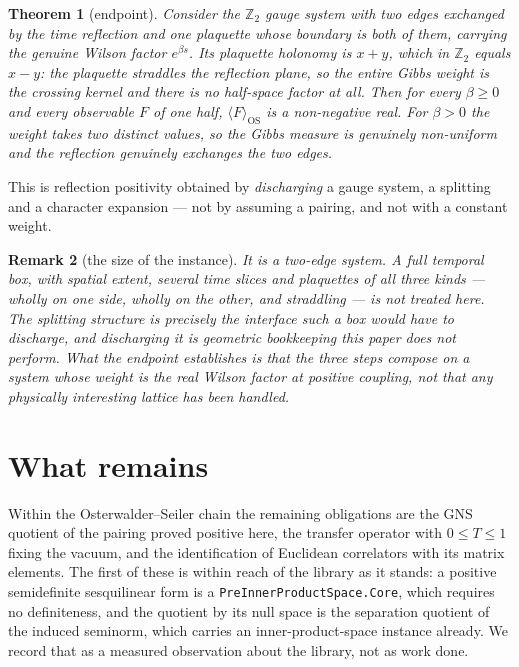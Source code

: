 \documentclass[11pt]{article}
\newtheorem{theorem}{Theorem}[section]
\newtheorem{remark}[theorem]{Remark}
\theoremstyle{definition}
\newcommand{\lean}[1]{\texttt{#1}}
\newcommand{\Z}{\mathbb{Z}}
\begin{document}
\begin{theorem}[endpoint]
\label{thm:endpoint}
Consider the $\Z_2$ gauge system with two edges exchanged by the time
reflection and one plaquette whose boundary is both of them, carrying the
genuine Wilson factor $e^{\beta s}$.  Its plaquette holonomy is $x+y$, which in
$\Z_2$ equals $x-y$: the plaquette \emph{straddles the reflection plane}, so the
entire Gibbs weight is the crossing kernel and there is no half-space factor at
all.  Then for every $\beta \ge 0$ and every observable $F$ of one half,
$\langle F\rangle_{\mathrm{OS}}$ is a non-negative real.  For $\beta > 0$ the
weight takes two distinct values, so the Gibbs measure is genuinely non-uniform
and the reflection genuinely exchanges the two edges.
\end{theorem}

This is reflection positivity obtained by \emph{discharging} a gauge system, a
splitting and a character expansion — not by assuming a pairing, and not with a
constant weight.

\begin{remark}[the size of the instance]
\label{rem:size}
It is a two-edge system.  A full temporal box, with spatial extent, several
time slices and plaquettes of all three kinds — wholly on one side, wholly on
the other, and straddling — is \emph{not} treated here.  The splitting
structure is precisely the interface such a box would have to discharge, and
discharging it is geometric bookkeeping this paper does not perform.  What the
endpoint establishes is that the three steps compose on a system whose weight
is the real Wilson factor at positive coupling, not that any physically
interesting lattice has been handled.
\end{remark}

\section{What remains}

Within the Osterwalder--Seiler chain the remaining obligations are the GNS
quotient of the pairing proved positive here, the transfer operator with
$0 \le T \le 1$ fixing the vacuum, and the identification of Euclidean
correlators with its matrix elements.  The first of these is within reach of
the library as it stands: a positive semidefinite sesquilinear form is a
\lean{PreInnerProductSpace.Core}, which requires no definiteness, and the
quotient by its null space is the separation quotient of the induced seminorm,
which carries an inner-product-space instance already.  We record that as a
measured observation about the library, not as work done.
\end{document}
